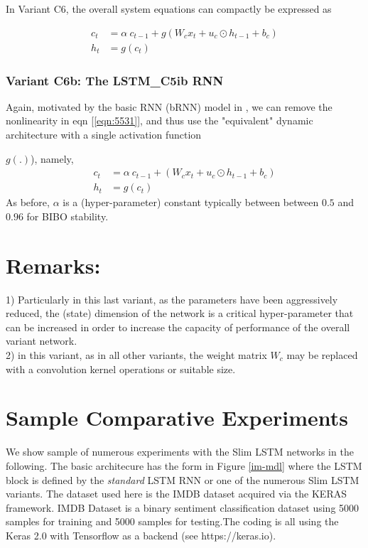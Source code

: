 \documentclass{article}
\begin{document}
{{{{{In Variant C6, the overall system equations can compactly be expressed as

\begin{align}
	\label{eqn:11}   c_t &= \alpha ~ c_{t-1} + g(W_c x_t + u_c \odot h_{t-1} + b_c) \\
	\label{eqn:12}	 h_t &=  g(c_t)
\end{align}

\subsubsection{Variant C6b: The LSTM\_C5ib RNN}

Again, motivated by the basic RNN (bRNN) model in \cite {salem2016basic}, we can remove the nonlinearity in eqn [\ref{eqn:5531}], and thus use the "equivalent" dynamic architecture with a single activation function {$g(.)$), namely,
\begin{align}
	\label{eqn:111}   c_t &= \alpha ~ c_{t-1} + (W_c x_t + u_c \odot h_{t-1} + b_c) \\
	\label{eqn:112}	 h_t &=  g(c_t)
\end{align}
As before, $\alpha$ is a (hyper-parameter) constant typically between between $0.5$ and $0.96$ for BIBO stability.
\section*{Remarks:}

1) Particularly in this last variant, as the parameters have been aggressively reduced, the (state) dimension of the network is a critical hyper-parameter that can be increased in order to increase the capacity of performance of the overall variant network.
\\

2) in this variant, as in all other variants, the weight matrix $W_c$ may be replaced with a convolution kernel operations or suitable size.

\section{Sample Comparative Experiments}

We show sample of numerous experiments with the Slim LSTM networks in the following. The basic architecure has the form in Figure \ref {im-mdl} where the LSTM block is defined by the \textit{standard} LSTM RNN or one of the numerous Slim LSTM variants. The dataset used here is the IMDB dataset acquired via the KERAS framework. IMDB Dataset is a binary sentiment classification dataset using 5000 samples for training and 5000 samples for testing.The coding is all using the Keras 2.0 with Tensorflow as a backend (see https://keras.io). \\

}}}}}}
\end{document}
